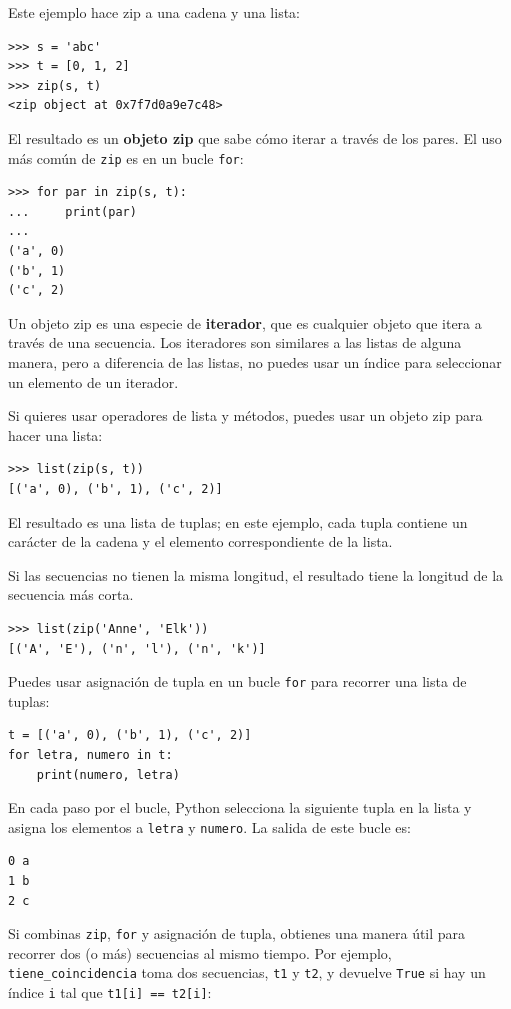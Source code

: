 \documentclass[10pt]{book}
\begin{document}
Este ejemplo hace zip a una cadena y una lista:

\begin{verbatim}
>>> s = 'abc'
>>> t = [0, 1, 2]
>>> zip(s, t)
<zip object at 0x7f7d0a9e7c48>
\end{verbatim}
%
El resultado es un {\bf objeto zip} que sabe cómo iterar a través
de los pares.  El uso más común de {\tt zip} es en un bucle {\tt for}:

\begin{verbatim}
>>> for par in zip(s, t):
...     print(par)
...
('a', 0)
('b', 1)
('c', 2)
\end{verbatim}
%
Un objeto zip es una especie de {\bf iterador}, que es cualquier objeto
que itera a través de una secuencia.  Los iteradores son similares a las listas de alguna
manera, pero a diferencia de las listas, no puedes usar un índice para seleccionar un elemento de
un iterador.

Si quieres usar operadores de lista y métodos, puedes
usar un objeto zip para hacer una lista:

\begin{verbatim}
>>> list(zip(s, t))
[('a', 0), ('b', 1), ('c', 2)]
\end{verbatim}
%
El resultado es una lista de tuplas; en este ejemplo, cada tupla contiene
un carácter de la cadena y el elemento correspondiente de
la lista.

Si las secuencias no tienen la misma longitud, el resultado tiene la
longitud de la secuencia más corta.

\begin{verbatim}
>>> list(zip('Anne', 'Elk'))
[('A', 'E'), ('n', 'l'), ('n', 'k')]
\end{verbatim}
%
Puedes usar asignación de tupla en un bucle {\tt for} para recorrer una lista de
tuplas:

\begin{verbatim}
t = [('a', 0), ('b', 1), ('c', 2)]
for letra, numero in t:
    print(numero, letra)
\end{verbatim}
%
En cada paso por el bucle, Python selecciona la siguiente tupla en
la lista y asigna los elementos a {\tt letra} y
{\tt numero}.  La salida de este bucle es:

\begin{verbatim}
0 a
1 b
2 c
\end{verbatim}
%
Si combinas {\tt zip}, {\tt for} y asignación de tupla, obtienes una
manera útil para recorrer dos (o más) secuencias al mismo
tiempo.  Por ejemplo, \verb"tiene_coincidencia" toma dos secuencias, {\tt t1} y
{\tt t2}, y devuelve {\tt True} si hay un índice {\tt i}
tal que {\tt t1[i] == t2[i]}:
\end{document}
